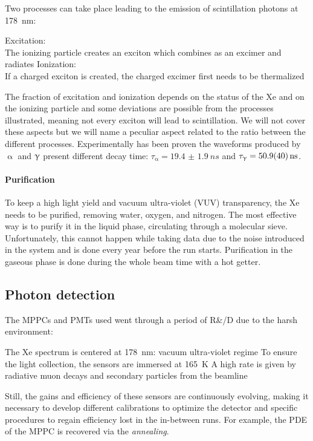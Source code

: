 \begin{refsection}
        \noindent
        Two processes can take place leading to the emission of scintillation photons at \SI{178}{nm}:
        \begin{outline}
            \1 Excitation: \\
            The ionizing particle creates an exciton which combines as an excimer and radiates
            \1 Ionization: \\
            If a charged exciton is created, the charged excimer first needs to be thermalized
        \end{outline}
        The fraction of excitation and ionization depends on the status of the Xe and on the ionizing particle and some deviations are possible from the processes illustrated, meaning not every exciton will lead to scintillation.
        We will not cover these aspects but we will name a peculiar aspect related to the ratio between the different processes.
        Experimentally has been proven the waveforms produced by $\upalpha$ and $\g$ present different decay time: $\tau_\upalpha = \SI{19.4(19)}{ns}$ and $\tau_\g = \SI{50.9(40)}{ns}$.
        
        \paragraph{Purification} To keep a high light yield and vacuum ultra-violet (VUV) transparency, the Xe needs to be purified, removing water, oxygen, and nitrogen. 
        The most effective way is to purify it in the liquid phase, circulating through a molecular sieve.
        Unfortunately, this cannot happen while taking data due to the noise introduced in the system and is done every year before the run starts.
        Purification in the gaseous phase is done during the whole beam time with a hot getter.

    \subsection{Photon detection}
        The MPPCs and PMTs used went through a period of R\&/D due to the harsh environment:
        \begin{outline}
            \1 The Xe spectrum is centered at \SI{178}{nm}: vacuum ultra-violet regime
            \1 To ensure the light collection, the sensors are immersed at \SI{165}{\kelvin}
            \1 A high rate is given by radiative muon decays and secondary particles  from the beamline
        \end{outline}
        \noindent
        Still, the gains and efficiency of these sensors are continuously evolving, making it necessary to develop different calibrations to optimize the detector and specific procedures to regain efficiency lost in the in-between runs.
        For example, the PDE of the MPPC is recovered via the \textit{annealing}.


\end{refsection}
